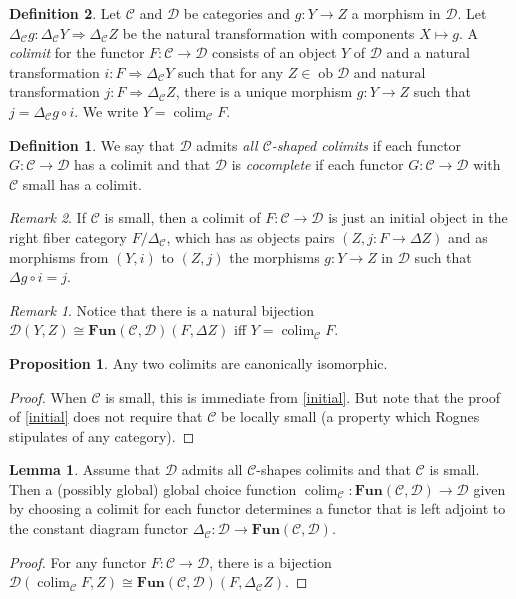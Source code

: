 \documentclass[10pt,letterpaper,cm]{nupset}
\theoremstyle{definition}
\newtheorem{definition}{Definition}
\theoremstyle{theorem}
\newtheorem{lemma}[theorem]{Lemma}
\newtheorem{prop}[theorem]{Proposition}
\theoremstyle{remark}
\newtheorem{remark}{Remark}
\newcommand{\1}{\mathbf{1}}
\renewcommand{\c}{\mathscr{C}}
\renewcommand{\d}{\mathscr{D}}
\newcommand{\0}{\vec 0}
\DeclareMathOperator{\ob}{ob}
\DeclareMathOperator{\colim}{colim}
\begin{document}
\begin{definition}
Let $\c$ and $\d$ be categories and $g: Y \to Z$ a morphism in $\d$. Let $\Delta_{\c} g : \Delta_{\c} Y \Rightarrow \Delta_{\c} Z$ be the natural transformation with components $X \mapsto g$. A \textit{colimit} for the functor $F: \c \to \d$ consists of an object $Y$ of $\d$ and a natural transformation $i : F \Rightarrow \Delta_{\c} Y$ such that for any $Z \in \ob \d$ and natural transformation $j: F \Rightarrow \Delta_{\c} Z$, there is a unique morphism $g: Y \to Z$ such that $j = \Delta_{\c}g \circ i$. We write $Y = \colim_{\c} F$.
\begin{definition} We say that $\d$ admits \textit{all $\c$-shaped colimits} if each functor $G: \c \to \d$ has a colimit and that $\d$ is \textit{cocomplete} if each functor $G : \c \to \d$ with $\c$ small has a colimit.
\end{definition}
\end{definition}

\begin{remark}
If $\c$ is small, then a colimit of $F: \c \to \d$ is just an initial object in the right fiber category $F/\Delta_{\c}$, which has as objects pairs $(Z, j: F \to \Delta Z)$ and as morphisms from $(Y, i)$ to $(Z, j)$ the morphisms $g : Y \to Z$ in $\d$ such that $\Delta g \circ i = j$.
\begin{remark}
Notice that there is a natural bijection $\d(Y, Z) \cong \mathbf{Fun}(\c, \d)(F, \Delta Z)$ iff $Y = \colim_{\c}F$.
\end{remark}
\end{remark}

\begin{prop}
Any two colimits are canonically isomorphic.
\end{prop}
\begin{proof}
When $\c$ is small, this is immediate from \cref{initial}. But note that the proof of \cref{initial} does not require that $\c$ be locally small (a property which Rognes stipulates of any category). 
\end{proof}

\begin{lemma}
Assume that $\d$ admits all $\c$-shapes colimits and that $\c$ is small. Then a (possibly global) global choice function $\colim_\c : \mathbf{Fun}(\c, \d) \to \d$ given by choosing a colimit for each functor determines a functor that is left adjoint to the constant diagram functor $\Delta_{\c} : \d \to \mathbf{Fun}(\c, \d)$.
\end{lemma}
\begin{proof}
For any functor $F : \c \to \d$, there is a bijection $\d(\colim_{\c} F, Z) \cong \mathbf{Fun}(\c, \d)(F, \Delta_{\c}Z)$.
\end{proof}
\end{document}
